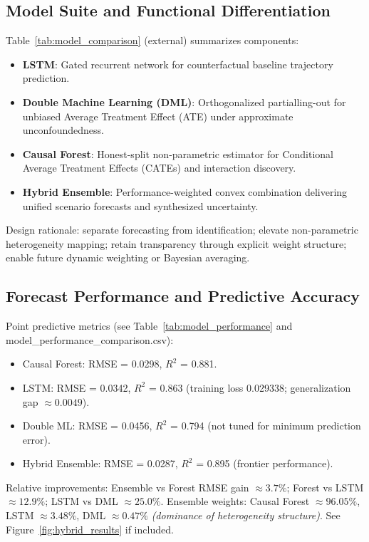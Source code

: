\subsection{Model Suite and Functional Differentiation}
Table~\ref{tab:model_comparison} (external) summarizes components:
\begin{itemize}
  \item \textbf{LSTM}: Gated recurrent network for counterfactual baseline trajectory prediction.
  \item \textbf{Double Machine Learning (DML)}: Orthogonalized partialling-out for unbiased Average Treatment Effect (ATE) under approximate unconfoundedness.
  \item \textbf{Causal Forest}: Honest-split non-parametric estimator for Conditional Average Treatment Effects (CATEs) and interaction discovery.
  \item \textbf{Hybrid Ensemble}: Performance-weighted convex combination delivering unified scenario forecasts and synthesized uncertainty.
\end{itemize}
Design rationale: separate forecasting from identification; elevate non-parametric heterogeneity mapping; retain transparency through explicit weight structure; enable future dynamic weighting or Bayesian averaging.

\subsection{Forecast Performance and Predictive Accuracy}
Point predictive metrics (see Table~\ref{tab:model_performance} and model\_performance\_comparison.csv):
\begin{itemize}
  \item Causal Forest: RMSE = 0.0298, $R^2$ = 0.881.
  \item LSTM: RMSE = 0.0342, $R^2$ = 0.863 (training loss 0.029338; generalization gap $\approx 0.0049$).
  \item Double ML: RMSE = 0.0456, $R^2$ = 0.794 (not tuned for minimum prediction error).
  \item Hybrid Ensemble: RMSE = 0.0287, $R^2$ = 0.895 (frontier performance).
\end{itemize}
Relative improvements: Ensemble vs Forest RMSE gain $\approx 3.7\%$; Forest vs LSTM $\approx 12.9\%$; LSTM vs DML $\approx 25.0\%$. Ensemble weights: Causal Forest $\approx 96.05\%$, LSTM $\approx 3.48\%$, DML $\approx 0.47\%$ \textit{(dominance of heterogeneity structure)}. See Figure~\ref{fig:hybrid_results} if included.

